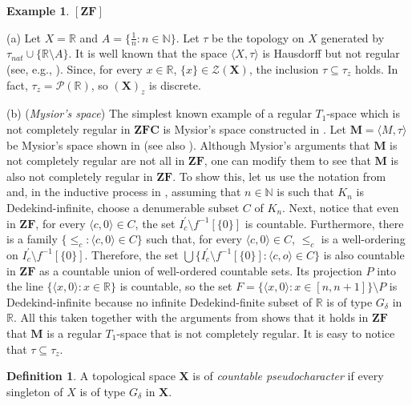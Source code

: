 \documentclass[12pt,twoside,leqno]{article}
\theoremstyle{plain}
\theoremstyle{definition}
\newtheorem{example}[theorem]{Example}
\newtheorem{definition}[theorem]{Definition}
\theoremstyle{remark}
\begin{document}
\begin{example}
	\label{s3:e4}
	$[\mathbf{ZF}]$
	
	(a) Let $X=\mathbb{R}$ and $A=\{\frac{1}{n}: n\in\mathbb{N}\}$. Let $\tau$ be the topology on $X$ generated by $\tau_{nat}\cup\{\mathbb{R}\setminus A\}$. It is well known that the space $\langle X, \tau\rangle$ is Hausdorff but not regular (see, e.g., \cite[Example 1.5.6]{en}). Since, for every $x\in\mathbb{R}$, $\{x\}\in\mathcal{Z}(\mathbf{X})$, the inclusion $\tau\subseteq\tau_z$ holds. In fact, $\tau_z=\mathcal{P}(\mathbb{R})$, so $(\mathbf{X})_z$ is discrete.\medskip
	
	(b) (\emph{Mysior's space}) The simplest known example of a regular $T_1$-space which is not completely regular in $\mathbf{ZFC}$ is Mysior's space constructed in \cite{mys}. Let $\mathbf{M}=\langle M, \tau\rangle$ be Mysior's space shown in \cite{mys} (see also \cite[Example 1.5.9]{en}). Although Mysior's arguments that $\mathbf{M}$ is not completely regular are not all in $\mathbf{ZF}$, one can modify them to see that $\mathbf{M}$ is also not completely regular in $\mathbf{ZF}$. To show this, let us use the notation from \cite{mys} and, in the inductive process in \cite{mys},  assuming that $n\in\mathbb{N}$ is such that $K_n$ is Dedekind-infinite, choose a denumerable subset $C$ of $K_n$.  Next, notice that even in $\mathbf{ZF}$, for every $\langle  c, 0\rangle\in C$, the set $I_c^{'}\setminus f^{-1}[\{0\}]$ is countable. Furthermore, there is a family $\{\leq_c:\langle c, 0\rangle\in C\}$ such that, for every $\langle c, 0\rangle\in C$, $\leq_c$ is a well-ordering on $I_c^{'}\setminus f^{-1}[\{0\}]$. Therefore, the set $\bigcup\{I_c^{'}\setminus f^{-1}[\{0\}]: \langle c, o\rangle\in C\}$ is also countable in $\mathbf{ZF}$ as a countable union of well-ordered countable sets. Its projection $P$ into the line $\{\langle x, 0\rangle: x\in\mathbb{R}\}$ is countable, so the set $F=\{\langle x, 0\rangle: x\in [n, n+1]\}\setminus P$ is Dedekind-infinite because no infinite Dedekind-finite subset of $\mathbb{R}$ is of type $G_{\delta}$ in $\mathbb{R}$. All this taken together with the arguments from \cite{mys} shows that it holds in $\mathbf{ZF}$ that $\mathbf{M}$ is a regular $T_1$-space that is not completely regular.  It is easy to notice that $\tau\subseteq\tau_z$. 
\end{example}

\begin{definition}
	\label{s3:d5}
	A topological space $\mathbf{X}$ is of \emph{countable pseudocharacter} if every singleton of $X$ is of type $G_{\delta}$ in $\mathbf{X}$.
\end{definition}
\end{document}
